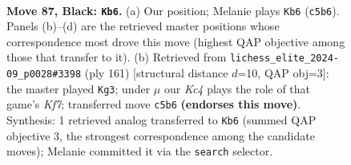 \documentclass[11pt]{article}
\begin{document}
\clearpage

\begin{figure}[p]\centering
\begin{subfigure}{0.46\textwidth}\centering
\resizebox{\linewidth}{!}{%
\newchessgame
\chessboard[
  setfen={2R5/8/8/2k3K1/r6P/3r4/8/8 b - - 16 87},
  showmover=false,
  pgfstyle=straightmove, color=movearrow, markmove={c5-b6}
]}
\caption{}
\end{subfigure}\hfill
\begin{subfigure}{0.46\textwidth}\centering
\resizebox{\linewidth}{!}{%
\newchessgame
\chessboard[
  setfen={8/8/8/1K6/P7/8/5k2/r7 b - - 3 81},
  showmover=false,
  pgfstyle=straightmove, color=movearrow, markmove={f2-g3}
]}
\caption{}
\end{subfigure}
\\[4pt]

\caption{\textbf{Move 87, Black: \texttt{Kb6}.} (a) Our position; Melanie plays \texttt{Kb6} (\texttt{c5b6}). Panels (b)--(d) are the retrieved master positions whose correspondence most drove this move (highest QAP objective among those that transfer to it). (b) Retrieved from \texttt{lichess\_elite\_2024-09\_p0028\#3398} (ply 161) [structural distance $d$=10, QAP obj=3]: the master played \texttt{Kg3}; under $\mu$ our \emph{Kc4} plays the role of that game's \emph{Kf7}; transferred move \texttt{c5b6} \textbf{(endorses this move)}. Synthesis: 1 retrieved analog transferred to \texttt{Kb6} (summed QAP objective 3, the strongest correspondence among the candidate moves); Melanie committed it via the \texttt{search} selector.}
\label{fig:thought-m173}
\end{figure}

\clearpage
\end{document}
